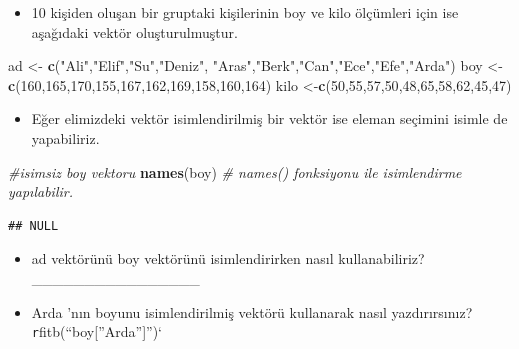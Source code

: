 \documentclass[
  oneside]{book}
\newenvironment{Shaded}{\begin{snugshade}}{\end{snugshade}}
\newcommand{\CommentTok}[1]{\textcolor[rgb]{0.56,0.35,0.01}{\textit{#1}}}
\newcommand{\DecValTok}[1]{\textcolor[rgb]{0.00,0.00,0.81}{#1}}
\newcommand{\FunctionTok}[1]{\textcolor[rgb]{0.13,0.29,0.53}{\textbf{#1}}}
\newcommand{\NormalTok}[1]{#1}
\newcommand{\OtherTok}[1]{\textcolor[rgb]{0.56,0.35,0.01}{#1}}
\newcommand{\StringTok}[1]{\textcolor[rgb]{0.31,0.60,0.02}{#1}}
\providecommand{\tightlist}{%
  \setlength{\itemsep}{0pt}\setlength{\parskip}{0pt}}
\begin{document}
\begin{itemize}
\tightlist
\item
  10 kişiden oluşan bir gruptaki kişilerinin boy ve kilo ölçümleri için ise aşağıdaki vektör oluşturulmuştur.
\end{itemize}

\begin{Shaded}
\begin{Highlighting}[]
\NormalTok{ad  }\OtherTok{\textless{}{-}}  \FunctionTok{c}\NormalTok{(}\StringTok{"Ali"}\NormalTok{,}\StringTok{"Elif"}\NormalTok{,}\StringTok{"Su"}\NormalTok{,}\StringTok{"Deniz"}\NormalTok{,}
\StringTok{"Aras"}\NormalTok{,}\StringTok{"Berk"}\NormalTok{,}\StringTok{"Can"}\NormalTok{,}\StringTok{"Ece"}\NormalTok{,}\StringTok{"Efe"}\NormalTok{,}\StringTok{"Arda"}\NormalTok{)}
\NormalTok{boy }\OtherTok{\textless{}{-}} \FunctionTok{c}\NormalTok{(}\DecValTok{160}\NormalTok{,}\DecValTok{165}\NormalTok{,}\DecValTok{170}\NormalTok{,}\DecValTok{155}\NormalTok{,}\DecValTok{167}\NormalTok{,}\DecValTok{162}\NormalTok{,}\DecValTok{169}\NormalTok{,}\DecValTok{158}\NormalTok{,}\DecValTok{160}\NormalTok{,}\DecValTok{164}\NormalTok{)}
\NormalTok{kilo }\OtherTok{\textless{}{-}}\FunctionTok{c}\NormalTok{(}\DecValTok{50}\NormalTok{,}\DecValTok{55}\NormalTok{,}\DecValTok{57}\NormalTok{,}\DecValTok{50}\NormalTok{,}\DecValTok{48}\NormalTok{,}\DecValTok{65}\NormalTok{,}\DecValTok{58}\NormalTok{,}\DecValTok{62}\NormalTok{,}\DecValTok{45}\NormalTok{,}\DecValTok{47}\NormalTok{)}
\end{Highlighting}
\end{Shaded}

\begin{itemize}
\tightlist
\item
  Eğer elimizdeki vektör isimlendirilmiş bir vektör ise eleman seçimini isimle de yapabiliriz.
\end{itemize}

\begin{Shaded}
\begin{Highlighting}[]
\CommentTok{\#isimsiz boy vektoru}
\FunctionTok{names}\NormalTok{(boy) }\CommentTok{\# names() fonksiyonu ile isimlendirme yapılabilir.}
\end{Highlighting}
\end{Shaded}

\begin{verbatim}
## NULL
\end{verbatim}

\begin{itemize}
\item
  ad vektörünü boy vektörünü isimlendirirken nasıl kullanabiliriz? \_\_\_\_\_\_\_\_\_\_\_\_\_\_\_\_
\item
  Arda 'nın boyunu isimlendirilmiş vektörü kullanarak nasıl yazdırırsınız? \texttt{r}fitb(``boy{[}''Arda''{]}'')`
\end{itemize}
\end{document}
